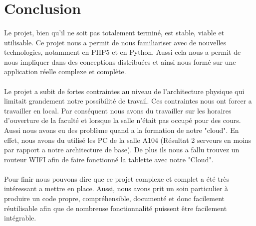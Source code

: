 \documentclass[a4paper,12pt]{article}
\begin{document}
\newpage

\section{Conclusion}
\paragraph*{}

Le projet, bien qu'il ne soit pas totalement terminé, est stable, viable et utilisable. Ce projet nous a permit de nous familiariser avec de nouvelles technologies, notamment en PHP5 et en Python. Aussi cela nous a permit de nous impliquer dans des conceptions distribuées et ainsi nous formé sur une application réelle complexe et complète.

\paragraph*{}
Le projet a subit de fortes contraintes au niveau de l'architecture physique qui limitait grandement notre possibilité de travail. Ces contraintes nous ont forcer a travailler en local. Par conséquent nous avons du travailler sur les horaires d'ouverture de la faculté et lorsque la salle n'était pas occupé pour des cours. Aussi nous avons eu des problème quand a la formation de notre "cloud". En effet, nous avons du utilisé les PC de la salle A104 (Résultat 2 serveurs en moins par rapport a notre architecture de base). De plus ils nous a fallu trouvez un routeur WIFI afin de faire fonctionné la tablette avec notre "Cloud".

\paragraph*{}
Pour finir nous pouvons dire que ce projet complexe et complet a été très intéressant a mettre en place. Aussi, nous avons prit un soin particulier à produire un code propre, compréhensible, documenté et donc facilement réutilisable afin que de nombreuse fonctionnalité puissent être facilement intégrable. 


\newpage
\listoffigures
\end{document}
